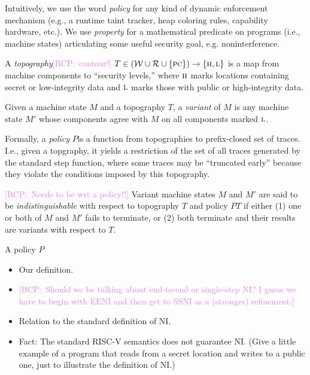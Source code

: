 \documentclass[conference]{IEEEtran}
\newif\ifdraft \drafttrue
\newif\iftext \textfalse
\newcommand{\bcp}[1]{\ifdraft\textcolor{violet}{{[BCP:~#1]}}\fi}
\newcommand{\HIGH}{\textsc{h}}
\newcommand{\LOW}{\textsc{l}}
\newcommand{\WORDS}{{\mathcal W}}
\newcommand{\REGS}{{\mathcal R}}
\newcommand{\mach}{M}
\newcommand{\PCname}{\textsc{pc}}
\newcommand{\polname}{P}
\newcommand{\pol}[1]{\polname{#1}}
\newcommand{\topo}{T}
\begin{document}
Intuitively, we use the word {\em policy} for any kind of dynamic
enforcement mechanism (e.g., a runtime taint tracker, heap coloring rules,
capability hardware, etc.). We use {\em property} for a mathematical
predicate on programs (i.e., machine states) articulating some useful
security goal, e.g. noninterference.

A {\em topography}\bcp{contour!}
$\topo \in (\WORDS \cup \REGS \cup \{\PCname\}) \rightarrow \{\HIGH,\LOW\}$ is a
map from machine components to ``security levels,'' where $\HIGH$ marks
locations containing secret or low-integrity data and $\LOW$ marks those
with public or high-integrity data.

Given a machine state $\mach$ and a topography $\topo$, a {\em variant}
of $\mach$ is any machine state $\mach'$ whose components agree with $\mach$
on all components marked $\LOW$.  \iftext\bcp{Spell it out formally.}\fi

Formally, a {\em policy} $\polname$\iftext\bcp{show its type? then we need
  some more metavariables... :-(}\fi is a function from topographies to
prefix-closed set of traces.  I.e., given a topgraphy, it yields a
restriction of the set of all traces generated by the standard step
function, where some traces may be ``truncated early'' because they violate
the conditions imposed by this topography.

\bcp{Needs to be wrt a policy!!}
Variant machine states $\mach$ and $\mach'$ are said to be {\em
  indistinguishable} with respect to topography $\topo$ and policy
$\pol{\topo}$ if either (1)
one or both of $\mach$ and $\mach'$ fails to terminate, or (2) both
terminate and their results are variants with respect to $\topo$.

A policy $P$

\begin{itemize}
\item Our definition.

\item \bcp{Should we be talking about end-to-end or single-step NI?  I guess we
  have to begin with EENI and then get to SSNI as a (stronger) refinement.}

\item Relation to the standard definition of NI.

\item Fact: The standard RISC-V semantics does not guarantee NI.  (Give a
little example of a program that reads from a secret location and writes to
a public one, just to illustrate the definition of NI.)
\end{itemize}
\end{document}
